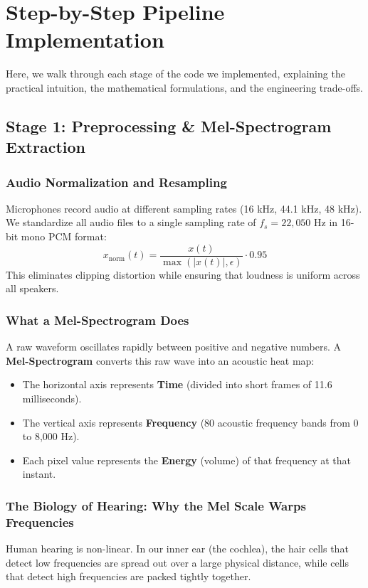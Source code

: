 \documentclass[11pt,a4paper]{article}
\begin{document}
\newpage

\section{Step-by-Step Pipeline Implementation}

Here, we walk through each stage of the code we implemented, explaining the practical intuition, the mathematical formulations, and the engineering trade-offs.

\subsection{Stage 1: Preprocessing \& Mel-Spectrogram Extraction}

\subsubsection{Audio Normalization and Resampling}
Microphones record audio at different sampling rates (16 kHz, 44.1 kHz, 48 kHz). We standardize all audio files to a single sampling rate of $f_s = 22,050\text{ Hz}$ in 16-bit mono PCM format:
\begin{equation}
x_{\text{norm}}(t) = \frac{x(t)}{\max(|x(t)|, \epsilon)} \cdot 0.95
\end{equation}
This eliminates clipping distortion while ensuring that loudness is uniform across all speakers.

\subsubsection{What a Mel-Spectrogram Does}
A raw waveform oscillates rapidly between positive and negative numbers. A \textbf{Mel-Spectrogram} converts this raw wave into an acoustic heat map:
\begin{itemize}
  \item The horizontal axis represents \textbf{Time} (divided into short frames of 11.6 milliseconds).
  \item The vertical axis represents \textbf{Frequency} (80 acoustic frequency bands from 0 to 8,000 Hz).
  \item Each pixel value represents the \textbf{Energy} (volume) of that frequency at that instant.
\end{itemize}

\subsubsection{The Biology of Hearing: Why the Mel Scale Warps Frequencies}
Human hearing is non-linear. In our inner ear (the cochlea), the hair cells that detect low frequencies are spread out over a large physical distance, while cells that detect high frequencies are packed tightly together.
\end{document}
